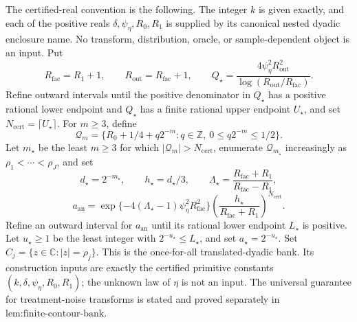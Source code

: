 The certified-real convention is the following.  The integer \(k\) is given exactly, and each of the positive reals \(\delta,\psi_{\eta},R_0,R_1\) is supplied by its canonical nested dyadic enclosure name.  No transform, distribution, oracle, or sample-dependent object is an input.  Put
\[
 R_{\mathrm{fac}}=R_1+1,
 \qquad R_{\mathrm{out}}=R_{\mathrm{fac}}+1,
 \qquad
 Q_{\star}=
 \frac{4\psi_{\eta}^2R_{\mathrm{out}}^2}
      {\log(R_{\mathrm{out}}/R_{\mathrm{fac}})}.
\]
Refine outward intervals until the positive denominator in \(Q_{\star}\) has a positive rational lower endpoint and \(Q_{\star}\) has a finite rational upper endpoint \(U_{\star}\), and set \(N_{\mathrm{cert}}=\lceil U_{\star}\rceil\).  For \(m\ge3\), define
\[
 \mathcal Q_m=
 \{R_0+1/4+q2^{-m}:q\in\mathbb Z,\ 0\le q2^{-m}\le1/2\}.
\]
Let \(m_{\star}\) be the least \(m\ge3\) for which \(|\mathcal Q_m|>N_{\mathrm{cert}}\), enumerate \(\mathcal Q_{m_{\star}}\) increasingly as \(\rho_1<\cdots<\rho_J\), and set
\[
 d_{\star}=2^{-m_{\star}},\qquad h_{\star}=d_{\star}/3,
 \qquad
 \Lambda_{\star}=\frac{R_{\mathrm{fac}}+R_1}{R_{\mathrm{fac}}-R_1},
\]
\[
 a_{\mathrm{an}}=
 \exp\{-4(\Lambda_{\star}-1)\psi_{\eta}^2R_{\mathrm{fac}}^2\}
 \left(\frac{h_{\star}}{R_{\mathrm{fac}}+R_1}\right)^{N_{\mathrm{cert}}}.
\]
Refine an outward interval for \(a_{\mathrm{an}}\) until its rational lower endpoint \(L_{\star}\) is positive.  Let \(u_{\star}\ge1\) be the least integer with \(2^{-u_{\star}}\le L_{\star}\), and set \(a_{\star}=2^{-u_{\star}}\).  Set \(C_j=\{z\in\mathbb C:|z|=\rho_j\}\).  This is the once-for-all translated-dyadic bank.  Its construction inputs are exactly the certified primitive constants \((k,\delta,\psi_{\eta},R_0,R_1)\); the unknown law of \(\eta\) is not an input.  The universal guarantee for treatment-noise transforms is stated and proved separately in \(\text{lem:finite-contour-bank}\).